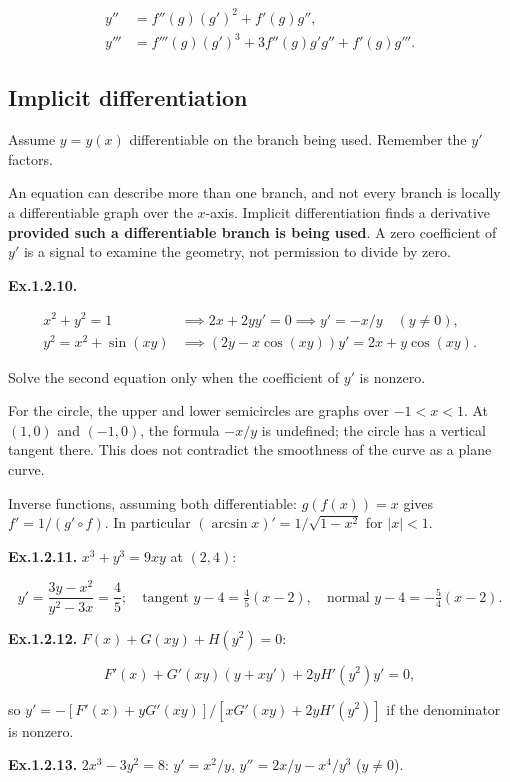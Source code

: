 \documentclass[11pt,a4paper]{article}
\begin{document}
\[
\begin{aligned}
y''&=f''(g)(g')^2+f'(g)g'',\\
y'''&=f'''(g)(g')^3+3f''(g)g'g''+f'(g)g'''.
\end{aligned}
\]

\subsection{Implicit differentiation}\label{implicit-differentiation}

Assume \(y=y(x)\) differentiable on the branch being used. Remember the
\(y'\) factors.

An equation can describe more than one branch, and not every branch is
locally a differentiable graph over the \(x\)-axis. Implicit
differentiation finds a derivative \textbf{provided such a
differentiable branch is being used}. A zero coefficient of \(y'\) is a
signal to examine the geometry, not permission to divide by zero.

\textbf{Ex.1.2.10.}

\[
\begin{aligned}
x^2+y^2=1&\implies2x+2yy'=0\implies y'=-x/y\quad(y\ne0),\\
y^2=x^2+\sin(xy)&\implies(2y-x\cos(xy))y'=2x+y\cos(xy).
\end{aligned}
\]

Solve the second equation only when the coefficient of \(y'\) is
nonzero.

For the circle, the upper and lower semicircles are graphs over
\(-1<x<1\). At \((1,0)\) and \((-1,0)\), the formula \(-x/y\) is
undefined; the circle has a vertical tangent there. This does not
contradict the smoothness of the curve as a plane curve.

Inverse functions, assuming both differentiable: \(g(f(x))=x\) gives
\(f'=1/(g'\circ f)\). In particular \((\arcsin x)'=1/\sqrt{1-x^2}\) for
\(|x|<1\).

\textbf{Ex.1.2.11.} \(x^3+y^3=9xy\) at \((2,4)\):

\[
y'=\frac{3y-x^2}{y^2-3x}=\frac45;\quad
\text{tangent }y-4=\tfrac45(x-2),\quad
\text{normal }y-4=-\tfrac54(x-2).
\]

\textbf{Ex.1.2.12.} \(F(x)+G(xy)+H(y^2)=0\):

\[
F'(x)+G'(xy)(y+xy')+2yH'(y^2)y'=0,
\]

so \(y'=-[F'(x)+yG'(xy)]/[xG'(xy)+2yH'(y^2)]\) if the denominator is
nonzero.

\textbf{Ex.1.2.13.} \(2x^3-3y^2=8\): \(y'=x^2/y\), \(y''=2x/y-x^4/y^3\)
(\(y\ne0\)).
\end{document}
